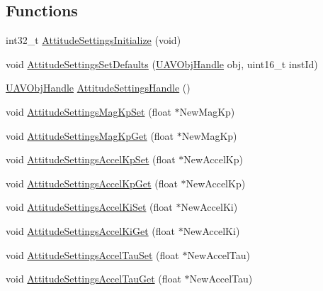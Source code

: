 \subsection*{\-Functions}
\begin{DoxyCompactItemize}
\item 
int32\-\_\-t \hyperlink{group___attitude_settings_ga3d90bbe5ce5fdb7c28bea738c318dd5a}{\-Attitude\-Settings\-Initialize} (void)
\item 
void \hyperlink{group___attitude_settings_gab6c7ef6d8a5f23b8caf3ab7b3c2208e1}{\-Attitude\-Settings\-Set\-Defaults} (\hyperlink{targets_2_u_a_v_objects_2inc_2uavobjectmanager_8h_a279053e22be53ce9f895043aaeb91e3b}{\-U\-A\-V\-Obj\-Handle} obj, uint16\-\_\-t inst\-Id)
\item 
\hyperlink{targets_2_u_a_v_objects_2inc_2uavobjectmanager_8h_a279053e22be53ce9f895043aaeb91e3b}{\-U\-A\-V\-Obj\-Handle} \hyperlink{group___attitude_settings_ga1f50fd4e79e08041b7db764e41ed6f0b}{\-Attitude\-Settings\-Handle} ()
\item 
void \hyperlink{group___attitude_settings_ga71b7e8817c527964953b78adb1d32c06}{\-Attitude\-Settings\-Mag\-Kp\-Set} (float $\ast$\-New\-Mag\-Kp)
\item 
void \hyperlink{group___attitude_settings_ga10afd4dae795a41ca55ebc5714c55acc}{\-Attitude\-Settings\-Mag\-Kp\-Get} (float $\ast$\-New\-Mag\-Kp)
\item 
void \hyperlink{group___attitude_settings_gaa8faca164421d35119964e5a65ce4ebc}{\-Attitude\-Settings\-Accel\-Kp\-Set} (float $\ast$\-New\-Accel\-Kp)
\item 
void \hyperlink{group___attitude_settings_ga51fbf624abe31343338e57832b46dfa8}{\-Attitude\-Settings\-Accel\-Kp\-Get} (float $\ast$\-New\-Accel\-Kp)
\item 
void \hyperlink{group___attitude_settings_ga4769ad5c012a6e07c04063090ee4e94a}{\-Attitude\-Settings\-Accel\-Ki\-Set} (float $\ast$\-New\-Accel\-Ki)
\item 
void \hyperlink{group___attitude_settings_ga5cebc90799a2474f2791ee2169ebe799}{\-Attitude\-Settings\-Accel\-Ki\-Get} (float $\ast$\-New\-Accel\-Ki)
\item 
void \hyperlink{group___attitude_settings_ga8f9faf14ef12e8ce76b9c8ee4d719775}{\-Attitude\-Settings\-Accel\-Tau\-Set} (float $\ast$\-New\-Accel\-Tau)
\item 
void \hyperlink{group___attitude_settings_gaa2425830c5e766888891acc63fbc4b87}{\-Attitude\-Settings\-Accel\-Tau\-Get} (float $\ast$\-New\-Accel\-Tau)
\item 

\end{DoxyCompactItemize}
